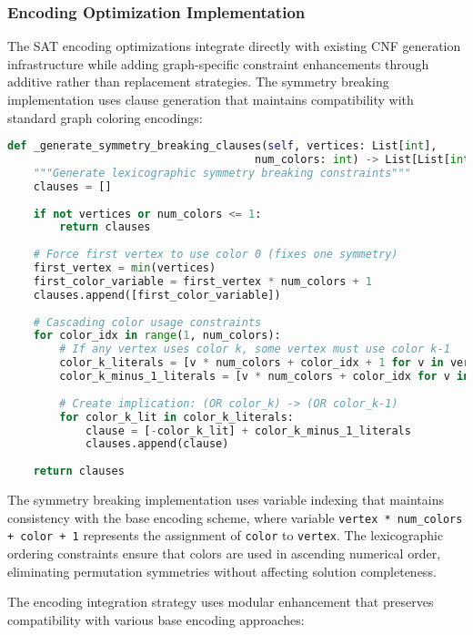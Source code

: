 \subsubsection{Encoding Optimization Implementation}

The SAT encoding optimizations integrate directly with existing CNF generation infrastructure while adding graph-specific constraint enhancements through additive rather than replacement strategies. The symmetry breaking implementation uses clause generation that maintains compatibility with standard graph coloring encodings:

\begin{lstlisting}[language=Python, caption=Symmetry Breaking Constraint Generation]
def _generate_symmetry_breaking_clauses(self, vertices: List[int], 
                                      num_colors: int) -> List[List[int]]:
    """Generate lexicographic symmetry breaking constraints"""
    clauses = []
    
    if not vertices or num_colors <= 1:
        return clauses
    
    # Force first vertex to use color 0 (fixes one symmetry)
    first_vertex = min(vertices)
    first_color_variable = first_vertex * num_colors + 1
    clauses.append([first_color_variable])
    
    # Cascading color usage constraints
    for color_idx in range(1, num_colors):
        # If any vertex uses color k, some vertex must use color k-1
        color_k_literals = [v * num_colors + color_idx + 1 for v in vertices]
        color_k_minus_1_literals = [v * num_colors + color_idx for v in vertices]
        
        # Create implication: (OR color_k) -> (OR color_k-1)
        for color_k_lit in color_k_literals:
            clause = [-color_k_lit] + color_k_minus_1_literals
            clauses.append(clause)
    
    return clauses
\end{lstlisting}

The symmetry breaking implementation uses variable indexing that maintains consistency with the base encoding scheme, where variable \texttt{vertex * num\_colors + color + 1} represents the assignment of \texttt{color} to \texttt{vertex}. The lexicographic ordering constraints ensure that colors are used in ascending numerical order, eliminating permutation symmetries without affecting solution completeness.

The encoding integration strategy uses modular enhancement that preserves compatibility with various base encoding approaches:

